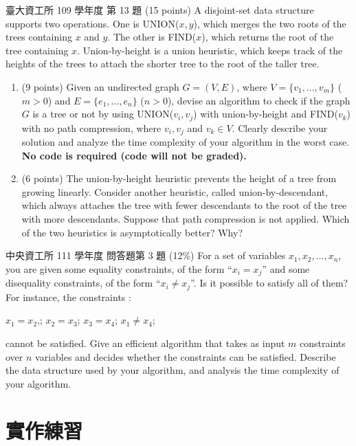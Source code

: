 \begin{pastexam}[label={px:ds-3}]{臺大資工所 109 學年度 第 13 題}
(15 points) A disjoint-set data structure supports two operations. One is UNION($x,y$), which merges the two roots of the trees containing $x$ and $y$. The other is FIND($x$), which returns the root of the tree containing $x$. Union-by-height is a union heuristic, which keeps track of the heights of the trees to attach the shorter tree to the root of the taller tree.
\begin{enumerate}[label=(\alph*)]
\item (9 points) Given an undirected graph $G=(V,E)$, where $V=\{v_1,\ldots,v_m\}$ ($m>0$) and $E=\{e_1,\ldots,e_n\}$ ($n>0$), devise an algorithm to check if the graph $G$ is a tree or not by using UNION($v_i,v_j$) with union-by-height and FIND($v_k$) with no path compression, where $v_i,v_j$ and $v_k\in V$. Clearly describe your solution and analyze the time complexity of your algorithm in the worst case. \textbf{No code is required (code will not be graded).}
\item (6 points) The union-by-height heuristic prevents the height of a tree from growing linearly. Consider another heuristic, called union-by-descendant, which always attaches the tree with fewer descendants to the root of the tree with more descendants. Suppose that path compression is not applied. Which of the two heuristics is asymptotically better? Why?
\end{enumerate}
\end{pastexam}

\begin{pastexam}[label={px:ds-4}]{中央資工所 111 學年度 問答題第 3 題}
(12\%) For a set of variables $x_1, x_2, \ldots, x_n$, you are given some equality constraints, of the form ``$x_i = x_j$'' and some disequality constraints, of the form ``$x_i \neq x_j$''. Is it possible to satisfy all of them? For instance, the constraints :

\quad $x_1 = x_2$,; $x_2 = x_3$; $x_3 = x_4$; $x_1 \neq x_4$;

cannot be satisfied. Give an efficient algorithm that takes as input $m$ constraints over $n$ variables and decides whether the constraints can be satisfied. Describe the data structure used by your algorithm, and analysis the time complexity of your algorithm.
\end{pastexam}

\section{實作練習}
\label{sec:ds-practice}


